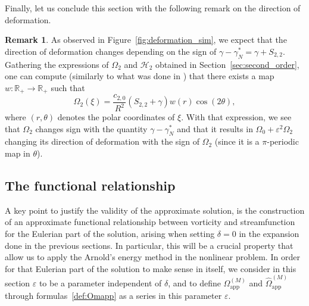 \documentclass[11pt,reqno,a4paper]{amsart}
\def\eps{\varepsilon}
\def\R {\mathbb{R}} %
\newcommand{\cH}{\mathcal{H}}
\newcommand{\1}{\mathbbm{1}}
\theoremstyle{definition}
\newtheorem{remark}[proposition]{Remark}
\theoremstyle{definition}
\numberwithin{equation}{section}
\newcommand{\Mapp}[2]{#1^{(#2)}_\mathrm{app}}
\begin{document}
\FloatBarrier
Finally, let us conclude this section with the following remark on the direction of deformation.
\begin{remark}
    As observed in Figure~\ref{fig:deformation_sim}, we expect that the direction of deformation changes depending on the sign of $\gamma - \gamma_N^* = \gamma + S_{2,2}$. Gathering the expressions of $\Omega_2$ and $\cH_2$ obtained in Section~\ref{sec:second_order}, one can compute (similarly to what was done in \cite{Gallay2011,dolce2024long,donati2025fast}) that there exists a map $w : \R_+ \to \R_+$ such that
    \begin{equation}
        \Omega_2(\xi) = \frac{c_{2,0}}{R^2} (S_{2,2} + \gamma) w(r)\cos(2\theta),
    \end{equation}
    where $(r,\theta)$ denotes the polar coordinates of $\xi$. With that expression, we see that $\Omega_2$ changes sign with the quantity $\gamma - \gamma_N^*$ and that it results in $\Omega_0 + \eps^2\Omega_2$ changing its direction of deformation with the sign of $\Omega_2$ (since it is a $\pi$-periodic map in $\theta$).
\end{remark}
\subsection{The functional relationship}\label{sec:func_rel}
A key point to justify the validity of the approximate solution, is the construction of an approximate functional relationship between vorticity and streamfunction for the Eulerian part of the solution, arising when setting $\delta=0$ in the expansion done in the previous sections. In particular, this will be a crucial property that allow us to apply the Arnold's energy method in the nonlinear problem. In order for that Eulerian part of the solution to make sense in itself, we consider in this section $\eps$ to be a parameter independent of $\delta$, and to define $\Mapp{\Omega}{M}$ and $\Mapp{\widehat{\Omega}}{M}$ through formulas~\cref{def:Omapp} as a series in this parameter $\eps$.
\end{document}
